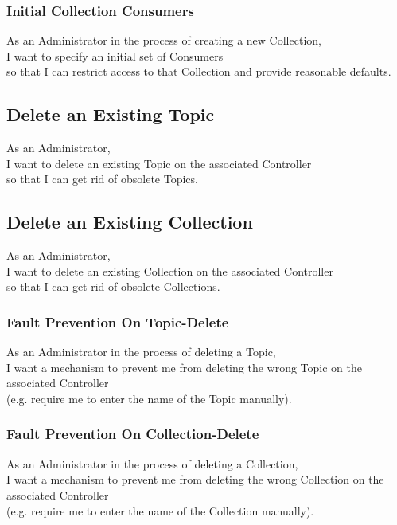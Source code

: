 \subsubsection{Initial Collection Consumers}

As an Administrator in the process of creating a new Collection,\\
I want to specify an initial set of Consumers \\
so that I can restrict access to that Collection and provide reasonable defaults.

\subsection{Delete an Existing Topic}

As an Administrator,\\
I want to delete an existing Topic on the associated Controller\\
so that I can get rid of obsolete Topics.

\subsection{Delete an Existing Collection}

As an Administrator,\\
I want to delete an existing Collection on the associated Controller\\
so that I can get rid of obsolete Collections.


\subsubsection{Fault Prevention On Topic-Delete}

As an Administrator in the process of deleting a Topic, \\
I want a mechanism to prevent me from deleting the wrong Topic on the associated Controller\\
(e.g. require me to enter the name of the Topic manually).

\subsubsection{Fault Prevention On Collection-Delete}

As an Administrator in the process of deleting a Collection, \\
I want a mechanism to prevent me from deleting the wrong Collection on the associated Controller\\
(e.g. require me to enter the name of the Collection manually).


